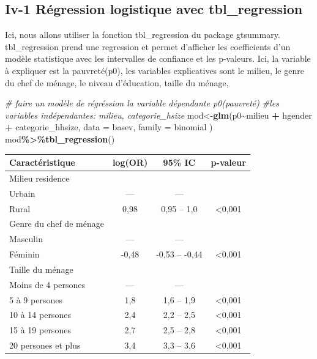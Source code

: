 \documentclass[
]{article}
\newenvironment{Shaded}{\begin{snugshade}}{\end{snugshade}}
\newcommand{\AttributeTok}[1]{\textcolor[rgb]{0.13,0.29,0.53}{#1}}
\newcommand{\CommentTok}[1]{\textcolor[rgb]{0.56,0.35,0.01}{\textit{#1}}}
\newcommand{\FunctionTok}[1]{\textcolor[rgb]{0.13,0.29,0.53}{\textbf{#1}}}
\newcommand{\NormalTok}[1]{#1}
\newcommand{\OtherTok}[1]{\textcolor[rgb]{0.56,0.35,0.01}{#1}}
\newcommand{\SpecialCharTok}[1]{\textcolor[rgb]{0.81,0.36,0.00}{\textbf{#1}}}
\begin{document}
\hypertarget{iv-1-ruxe9gression-logistique-avec-tbl_regression}{%
\subsection{Iv-1 Régression logistique avec
tbl\_regression}\label{iv-1-ruxe9gression-logistique-avec-tbl_regression}}

Ici, nous allons utiliser la fonction tbl\_regression du package
gtsummary. tbl\_regression prend une regression et permet d'afficher les
coefficients d'un modèle statistique avec les intervalles de confiance
et les p-valeurs. Ici, la variable à expliquer est la pauvreté(p0), les
variables explicatives sont le milieu, le genre du chef de ménage, le
niveau d'éducation, taille du ménage,

\begin{Shaded}
\begin{Highlighting}[]
\CommentTok{\# faire un modèle de régréssion la variable dépendante p0(pauvreté)  }
\CommentTok{\#les variables indépendantes: milieu, categorie\_hsize}
\NormalTok{mod}\OtherTok{\textless{}{-}}\FunctionTok{glm}\NormalTok{(p0}\SpecialCharTok{\textasciitilde{}}\NormalTok{milieu }\SpecialCharTok{+}\NormalTok{ hgender }\SpecialCharTok{+}\NormalTok{ categorie\_hhsize, }
         \AttributeTok{data =}\NormalTok{ basev, }\AttributeTok{family =}\NormalTok{ binomial}
\NormalTok{         )}
\NormalTok{mod}\SpecialCharTok{\%\textgreater{}\%}\FunctionTok{tbl\_regression}\NormalTok{()}
\end{Highlighting}
\end{Shaded}

\begin{longtable}[]{@{}lccc@{}}
\toprule\noalign{}
\textbf{Caractéristique} & \textbf{log(OR)} & \textbf{95\% IC} &
\textbf{p-valeur} \\
\midrule\noalign{}
\endhead
\bottomrule\noalign{}
\endlastfoot
Milieu residence & & & \\
Urbain & --- & --- & \\
Rural & 0,98 & 0,95 -- 1,0 & \textless0,001 \\
Genre du chef de ménage & & & \\
Masculin & --- & --- & \\
Féminin & -0,48 & -0,53 -- -0,44 & \textless0,001 \\
Taille du ménage & & & \\
Moins de 4 persones & --- & --- & \\
5 à 9 persones & 1,8 & 1,6 -- 1,9 & \textless0,001 \\
10 à 14 persones & 2,4 & 2,2 -- 2,5 & \textless0,001 \\
15 à 19 persones & 2,7 & 2,5 -- 2,8 & \textless0,001 \\
20 persones et plus & 3,4 & 3,3 -- 3,6 & \textless0,001 \\
\end{longtable}
\end{document}
